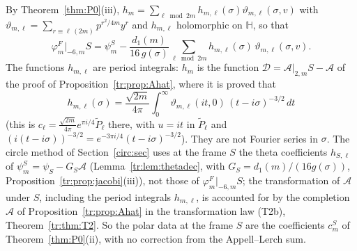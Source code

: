 \begin{remark}\label{rem:appell}
By Theorem~\ref{thm:P0}(iii), $h_m=\sum_{\ell\bmod2m}h_{m,\ell}(\sigma)\vartheta_{m,\ell}(\sigma,v)$ with $\vartheta_{m,\ell}=\sum_{r\equiv\ell\,(2m)}p^{r^2/4m}y^r$ and $h_{m,\ell}$ holomorphic on $\mathbb H$, so that
\[
\varphi^F_m|_{-6,m}S=\psi^S_m-\frac{d_1(m)}{16\,g(\sigma)}\sum_{\ell\bmod 2m}h_{m,\ell}(\sigma)\,\vartheta_{m,\ell}(\sigma,v).
\]
The functions $h_{m,\ell}$ are period integrals: $h_m$ is the function $\mathcal D=\mathcal A|_{2,m}S-\mathcal A$ of the proof of Proposition~\ref{tr:prop:Ahat}, where it is proved that
\[
h_{m,\ell}(\sigma)=\frac{\sqrt{2m}}{4\pi}\int_0^\infty\vartheta_{m,\ell}(it,0)\,(t-i\sigma)^{-3/2}\,dt
\]
(this is $c_\ell=\frac{\sqrt{2m}}{4\pi}e^{\pi i/4}\tilde P_\ell$ there, with $u=it$ in $\tilde P_\ell$ and $(i(t-i\sigma))^{-3/2}=e^{-3\pi i/4}(t-i\sigma)^{-3/2}$). They are not Fourier series in $\sigma$. The circle method of Section~\ref{circ:sec} uses at the frame $S$ the theta coefficients $h_{S,\ell}$ of $\psi^S_m=\psi_S-G_S\mathcal A$ (Lemma~\ref{tr:lem:thetadec}, with $G_S=d_1(m)/(16g(\sigma))$, Proposition~\ref{tr:prop:jacobi}(iii)), not those of $\varphi^F_m|_{-6,m}S$; the transformation of $\mathcal A$ under $S$, including the period integrals $h_{m,\ell}$, is accounted for by the completion $\widehat{\mathcal A}$ of Proposition~\ref{tr:prop:Ahat} in the transformation law \textup{(T2b)}, Theorem~\ref{tr:thm:T2}. So the polar data at the frame $S$ are the coefficients $c^S_m$ of Theorem~\ref{thm:P0}(ii), with no correction from the Appell--Lerch sum.
\end{remark}


